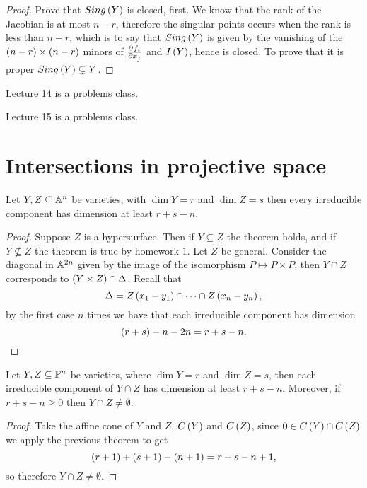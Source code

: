 \begin{proof}
Prove that $ Sing\br{Y} $ is closed, first. We know that the rank of the Jacobian is at most $ n - r $, therefore the singular points occurs when the rank is less than $ n - r $, which is to say that $ Sing\br{Y} $ is given by the vanishing of the $ \br{n - r} \times \br{n - r} $ minors of $ \tpd{f_i}{x_j} $ and $ I\br{Y} $, hence is closed. To prove that it is proper $ Sing\br{Y} \subsetneq Y $.
\end{proof}


Lecture 14 is a problems class.


Lecture 15 is a problems class.

\pagebreak

\section{Intersections in projective space}


\begin{theorem}
Let $ Y, Z \subseteq \AA^n $ be varieties, with $ \dim Y = r $ and $ \dim Z = s $ then every irreducible component has dimension at least $ r + s - n $.
\end{theorem}

\begin{proof}
Suppose $ Z $ is a hypersurface. Then if $ Y \subseteq Z $ the theorem holds, and if $ Y \nsubseteq Z $ the theorem is true by homework $ 1 $. Let $ Z $ be general. Consider the diagonal in $ \AA^{2n} $ given by the image of the isomorphism $ P \mapsto P \times P $, then $ Y \cap Z $ corresponds to $ \br{Y \times Z} \cap \Delta $. Recall that
$$ \Delta = Z\br{x_1 - y_1} \cap \dots \cap Z\br{x_n - y_n}, $$
by the first case $ n $ times we have that each irreducible component has dimension
$$ \br{r + s} - n - 2n = r + s - n. $$
\end{proof}

\begin{theorem}
Let $ Y, Z \subseteq \PP^n $ be varieties, where $ \dim Y = r $ and $ \dim Z = s $, then each irreducible component of $ Y \cap Z $ has dimension at least $ r + s - n $. Moreover, if $ r + s - n \ge 0 $ then $ Y \cap Z \ne \emptyset $.
\end{theorem}

\begin{proof}
Take the affine cone of $ Y $ and $ Z $, $ C\br{Y} $ and $ C\br{Z} $, since $ 0 \in C\br{Y} \cap C\br{Z} $ we apply the previous theorem to get
$$ \br{r + 1} + \br{s + 1} - \br{n + 1} = r + s - n + 1, $$
so therefore $ Y \cap Z \ne \emptyset $.
\end{proof}

